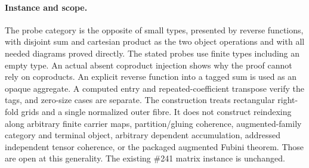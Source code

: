 \documentclass{article}
\begin{document}
\paragraph{Instance and scope.}
The probe category is the opposite of small types, presented by reverse
functions, with disjoint sum and cartesian product as the two object
operations and with all needed diagrams proved directly. The stated
probes use finite types including an empty type. An actual absent
coproduct injection shows why the proof cannot rely on coproducts.
An explicit reverse function into a tagged sum is used as an opaque
aggregate. A computed entry and repeated-coefficient transpose verify
the tags, and zero-size cases are separate.
The construction treats rectangular right-fold grids and a single normalized
outer fibre. It does not construct reindexing along arbitrary finite carrier
maps, partition/gluing coherence, augmented-family category and terminal
object, arbitrary dependent accumulation, addressed independent tensor
coherence, or the packaged augmented Fubini theorem. Those are open at this
generality. The existing \#241 matrix instance is unchanged.
\end{document}
